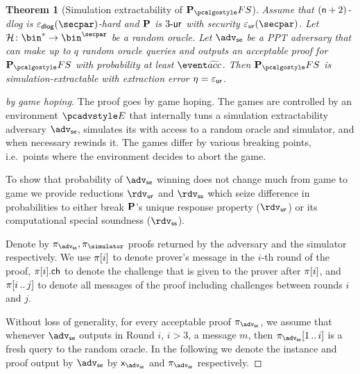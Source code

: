 \documentclass[runningheads,11pt]{llncs}
\newtheorem{theorem}{Theorem}%
\theoremstyle{definition}
\begin{document}
\begin{theorem}[Simulation extractability of $\plonkprot_\fs$]
	\label{thm:plonkprotfs_se}
	Assume that $(\mathsf{n} + 2)$-dlog is $\eps_\dlog(\secpar)$-hard and $\mathbf{P}$ is ${3\text{-}\mathsf{ur}}$ with security $\epsur(\secpar)$. 
	Let $\ro\colon \bin^* \to \bin^\secpar$ be a random oracle. 
	Let $\advse$ be a PPT adversary that can make up to $q$ random oracle queries and outputs an acceptable proof for $\plonkprotfs$ with probability at least $\waccProb$.
	Then $\plonkprotfs$ is simulation-extractable with extraction error $\eta = \varepsilon_{\mathsf{ur}}$.
\end{theorem}
\begin{proof}[by game hoping]
	The proof goes by game hoping. The games are controlled by an environment $\env$ that internally tuns a simulation extractability adversary $\advse$, simulates its with access to a random oracle and simulator, and when necessary rewinds it.
	The games differ by various breaking points, i.e.~points where the environment decides to abort the game. 
	
	To show that probability of $\advse$ winning does not change much from game to game we provide reductions $\rdvur$ and $\rdvss$ which seize difference in probabilities to either break $\mathbf{P}$'s unique response property ($\rdvur$) or its computational special soundness ($\rdvss$).

	Denote by $\zkproof_{\advse}, \zkproof_{\simulator}$ proofs
	returned by the adversary and the simulator respectively. We use $\pi[i]$
	to denote prover's message in the $i$-th round of the proof, $\pi[i].\mathsf{ch}$
	to denote the challenge that is given to the prover after $\pi[i]$, and
	$\pi[i \, .. \, j]$ to denote all messages of the proof including challenges between rounds $i$ and $j$.

	Without loss of generality, for every acceptable proof $\zkproof_{\advse}$, we
	assume that whenever $\advse$ outputs in Round $i$, $i 
	> 3$, a message $m$, then
	$\zkproof_{\advse}\range{1}{i}$ is a fresh query to the random oracle.
	In the following we denote the instance and proof output by $\advse$ by $\inp_\advse$ and $\zkproof_\advse$ respectively.
	

\end{proof}
\end{document}
